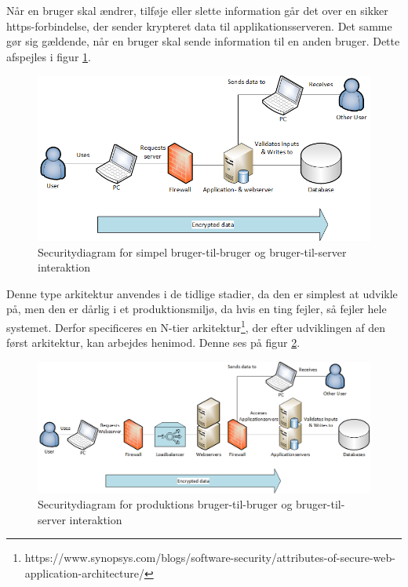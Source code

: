 \documentclass[Arkitektur/System_main.tex]{subfiles}
\begin{document}
Når en bruger skal ændrer, tilføje eller slette information går det over en sikker https-forbindelse, der sender krypteret data til applikationsserveren. Det samme gør sig gældende, når en bruger skal sende information til en anden bruger. Dette afspejles i figur \ref{fig:security_diagram_first}.
\begin{figure}[H]
    \centering
    \includegraphics[width=\textwidth]{Arkitektur/graphics/SecurityDiagramFirst.png}
    \caption{Securitydiagram for simpel bruger-til-bruger og bruger-til-server interaktion}
    \label{fig:security_diagram_first}
\end{figure}
Denne type arkitektur anvendes i de tidlige stadier, da den er simplest at udvikle på, men den er dårlig i et produktionsmiljø, da hvis en ting fejler, så fejler hele systemet. Derfor specificeres en N-tier arkitektur\footnote{https://www.synopsys.com/blogs/software-security/attributes-of-secure-web-application-architecture/}, der efter udviklingen af den først arkitektur, kan arbejdes henimod. Denne ses på figur \ref{fig:security_diagram}.

\begin{figure}[H]
    \centering
    \includegraphics[width=\textwidth]{Arkitektur/graphics/SecurityDiagram.png}
    \caption{Securitydiagram for produktions bruger-til-bruger og bruger-til-server interaktion}
    \label{fig:security_diagram}
\end{figure}
\end{document}
